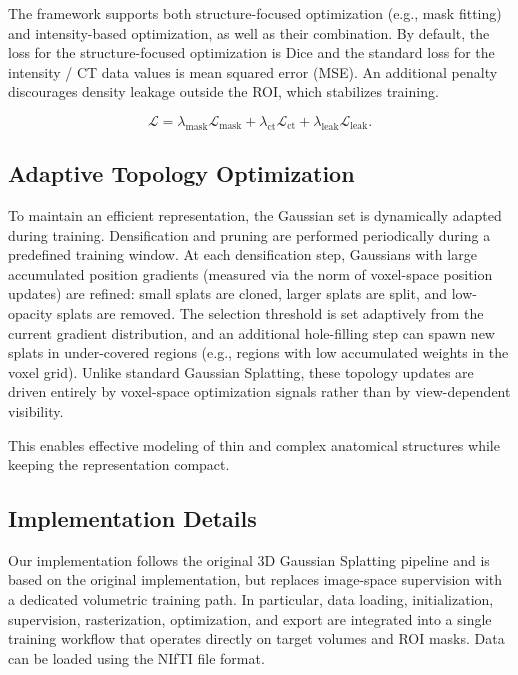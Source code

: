 \documentclass[runningheads]{llncs}
\begin{document}
The framework supports both structure-focused optimization (e.g., mask fitting) and intensity-based optimization, as well as their combination. By default, the loss for the structure-focused optimization is Dice and the standard loss for the intensity / CT data values is mean squared error (MSE). An additional penalty discourages density leakage outside the ROI, which stabilizes training.

\begin{equation}
\mathcal{L} = \lambda_{\mathrm{mask}} \mathcal{L}_{\mathrm{mask}} + \lambda_{\mathrm{ct}} \mathcal{L}_{\mathrm{ct}} + \lambda_{\mathrm{leak}} \mathcal{L}_{\mathrm{leak}}.
\end{equation}

\subsection{Adaptive Topology Optimization}
To maintain an efficient representation, the Gaussian set is dynamically adapted during training. Densification and pruning are performed periodically during a predefined training window. At each densification step, Gaussians with large accumulated position gradients (measured via the norm of voxel-space position updates) are refined: small splats are cloned, larger splats are split, and low-opacity splats are removed. The selection threshold is set adaptively from the current gradient distribution, and an additional hole-filling step can spawn new splats in under-covered regions (e.g., regions with low accumulated weights in the voxel grid). Unlike standard Gaussian Splatting, these topology updates are driven entirely by voxel-space optimization signals rather than by view-dependent visibility.

This enables effective modeling of thin and complex anatomical structures while keeping the representation compact.

\subsection{Implementation Details}
Our implementation follows the original 3D Gaussian Splatting pipeline and is based on the original implementation, but replaces image-space supervision with a dedicated volumetric training path. In particular, data loading, initialization, supervision, rasterization, optimization, and export are integrated into a single training workflow that operates directly on target volumes and ROI masks. Data can be loaded using the NIfTI file format.
\end{document}
